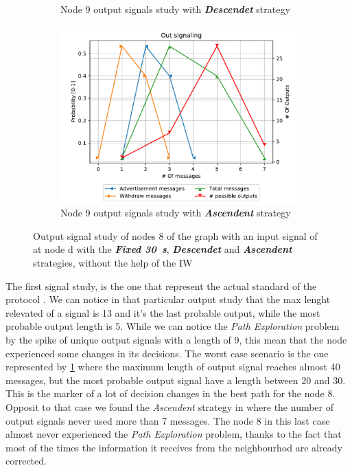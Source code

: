 \begin{figure}[h]
\begin{subfigure}[b]{0.32\textwidth}
		 \caption{Node \num{9} output signals study with \textbf{\textit{Descendet}} strategy}
         \label{fig:signal_node9_fabrikant_descendent_noiw}
     \end{subfigure}
     \hfill
     \begin{subfigure}[b]{0.32\textwidth}
         \centering
         \includegraphics[width=\textwidth]{images/signal_study/fabrikant/Ascending.pdf}
		 \caption{Node \num{9} output signals study with \textbf{\textit{Ascendent}} strategy}
         \label{fig:signal_node9_fabrikant_ascendent_noIW}
     \end{subfigure}
		\caption{Output signal study of nodes \num{8} of the graph 
			 with an input signal of  at node \num{d}
			with the \textbf{\textit{Fixed \SI{30}{\second}}}, \textbf{\textit{Descendet}}
			and \textbf{\textit{Ascendent}}	strategies, without the help of the \ac{IW}}
        \label{fig:signal_fabrikant}
\end{figure}

The first signal study,  is the
one that represent the actual standard of the protocol \cite{rfc4271}.
We can notice in that particular output study that the max lenght relevated of
a signal is \num{13} and it's the last probable output, while the most probable
output length is \num{5}.
While we can notice the \textit{Path Exploration} problem by the spike of unique
output signals with a length of \num{9}, this mean that the node experienced some
changes in its decisions.
The worst case scenario is the one represented by \cref{fig:signal_node9_fabrikant_descendent_noiw}
where the maximum length of output signal reaches almost \num{40} messages, but
the most probable output signal have a length between \num{20} and \num{30}.
This is the marker of a lot of decision changes in the best path for the node \num{8}.
Opposit to that case we found the \textit{Ascendent} strategy in 
 where the number of output
signals never used more than \num{7} messages.
The node \num{8} in this last case almost never experienced the \textit{Path Exploration}
problem, thanks to the fact that most of the times the information it receives
from the neighbourhod are already corrected.

